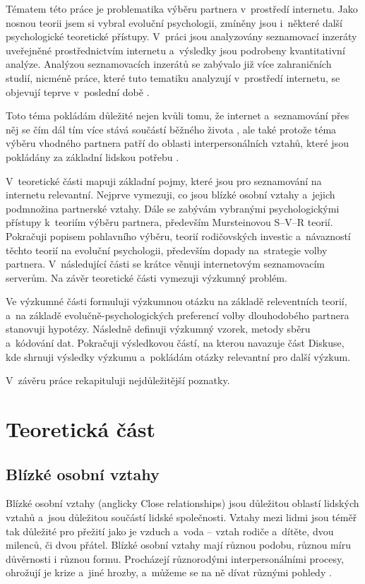 \documentclass[a4paper, 12pt, notitlepage, oneside, numbers=noenddot]{report}
\begin{document}
Tématem této práce je problematika výběru partnera v~prostředí
internetu.  Jako nosnou teorii jsem si vybral evoluční psychologii,
zmíněny jsou i~některé další psychologické teoretické přístupy.
V~prá\-ci jsou analyzovány seznamovací inzeráty uveřejněné
prostřednictvím internetu a~výsledky jsou podrobeny kvantitativní
analýze.  Analýzou seznamovacích inzerátů se zabývalo již více
zahraničních studií, nicméně práce, které tuto tematiku analyzují
v~prostředí internetu, se objevují teprve v~poslední době
\citep{HallEtAl2010, EllisonEtAl2006, GibbsEtAl2006}.

Toto téma pokládám důležité nejen kvůli tomu, že internet
a~seznamování přes něj se čím dál tím více stává součástí běžného
života \citep{EllisonEtAl2006}, ale také protože téma výběru vhodného
partnera patří do oblasti interpersonálních vztahů, které jsou
pokládány za základní lidskou potřebu \citep{Slamenik2008}.

V~teoretické části mapuji základní pojmy, které jsou pro seznamování
na internetu relevantní.  Nejprve vymezuji, co jsou blízké osobní
vztahy a~jejich podmnožina partnerské vztahy.  Dále se zabývám
vybranými psychologickými přístupy k~teoriím výběru partnera,
především Mursteinovou S--V--R teorií.  Pokračuji popisem pohlavního
výběru, teo\-rií rodičovských investic a~návazností těchto teorií na
evoluční psychologii, především dopady na~strategie volby partnera.
V~následující části se krátce věnuji internetovým seznamovacím
serverům.  Na závěr teoretické části vymezuji výzkum\-ný pro\-blém.

Ve výzkumné části formuluji výzkumnou otázku na základě releventních
teorií, a~na základě evolučně-psychologických preferencí volby
dlouhodobého partnera stanovuji hypotézy.  Následně definuji výzkumný
vzorek, metody sběru a~kódování dat.  Pokračuji výsledkovou částí, na
kterou navazuje část Diskuse, kde shrnuji výsledky výzkumu a~pokládám
otázky relevantní pro další výzkum.

V~závěru práce rekapituluji nejdůležitější poznatky.

\chapter[Teoretická část]{Teoretická část}
\section{Blízké osobní vztahy}
Blízké osobní vztahy (anglicky Close relationships) jsou důležitou
oblastí lidských vztahů a~jsou důležitou součástí lidské společnosti.
Vztahy mezi lidmi jsou téměř tak důležité pro přežití jako je vzduch
a~voda -- vztah rodiče a~dítěte, dvou milenců, či dvou přátel.  Blízké
osobní vztahy mají různou podobu, různou míru důvěrnosti i různou
formu.  Procházejí různorodými interpersonálními procesy, ohrožují je
krize a~jiné hrozby, a~můžeme se na ně dívat různými pohledy
\citep{HendrickHendrick2000}.
\end{document}
